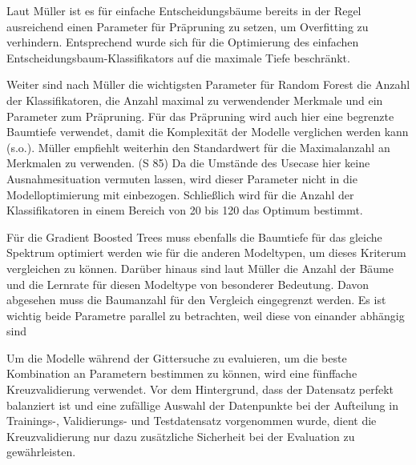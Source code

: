 Laut Müller  ist es für einfache Entscheidungsbäume bereits in der Regel ausreichend einen Parameter für Präpruning zu setzen, um Overfitting zu verhindern. Entsprechend wurde sich für die Optimierung des einfachen Entscheidungsbaum-Klassifikators auf die maximale Tiefe beschränkt. 

Weiter sind nach Müller die wichtigsten Parameter für Random Forest die Anzahl der Klassifikatoren, die Anzahl maximal zu verwendender Merkmale und ein Parameter zum Präpruning. Für das Präpruning wird auch hier eine begrenzte Baumtiefe verwendet, damit die Komplexität der Modelle verglichen werden kann (s.o.). 
Müller empfiehlt weiterhin den Standardwert für die Maximalanzahl an Merkmalen zu verwenden. (S 85) Da die Umstände des Usecase hier keine Ausnahmesituation vermuten lassen, wird dieser Parameter nicht in die Modelloptimierung mit einbezogen.
Schließlich wird für die Anzahl der Klassifikatoren in einem Bereich von 20 bis 120 das Optimum bestimmt.

Für die Gradient Boosted Trees muss ebenfalls die Baumtiefe für das gleiche Spektrum optimiert werden wie für die anderen Modeltypen, um dieses Kriterum vergleichen zu können. Darüber hinaus sind laut Müller  die Anzahl der Bäume und die Lernrate für diesen Modeltype von besonderer Bedeutung. Davon abgesehen muss die Baumanzahl für den Vergleich eingegrenzt werden. Es ist wichtig beide Parametre parallel zu betrachten, weil diese von einander abhängig sind 

Um die Modelle während der Gittersuche zu evaluieren, um die beste Kombination an Parametern bestimmen zu können, wird eine fünffache Kreuzvalidierung verwendet. Vor dem Hintergrund, dass der Datensatz perfekt balanziert ist und eine zufällige Auswahl der Datenpunkte bei der Aufteilung in Trainings-, Validierungs- und Testdatensatz vorgenommen wurde, dient die Kreuzvalidierung nur dazu zusätzliche Sicherheit bei der Evaluation zu gewährleisten.